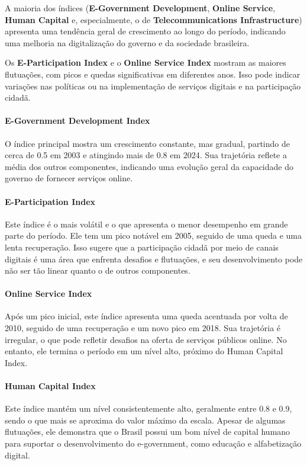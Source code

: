 A maioria dos índices (\textbf{E-Government Development}, \textbf{Online Service},  \textbf{Human Capital} e, especialmente, o de  \textbf{Telecommunications Infrastructure}) apresenta uma tendência geral de crescimento ao longo do período, indicando uma melhoria na digitalização do governo e da sociedade brasileira.

Os  \textbf{E-Participation Index} e o \textbf{Online Service Index} mostram as maiores flutuações, com picos e quedas significativas em diferentes anos. Isso pode indicar variações nas políticas ou na implementação de serviços digitais e na participação cidadã.

\paragraph{E-Government Development Index} O índice principal mostra um crescimento constante, mas gradual, partindo de cerca de 0.5 em 2003 e atingindo mais de 0.8 em 2024. Sua trajetória reflete a média dos outros componentes, indicando uma evolução geral da capacidade do governo de fornecer serviços online.

\paragraph{E-Participation Index} Este índice é o mais volátil e o que apresenta o menor desempenho em grande parte do período. Ele tem um pico notável em 2005, seguido de uma queda e uma lenta recuperação. Isso sugere que a participação cidadã por meio de canais digitais é uma área que enfrenta desafios e flutuações, e seu desenvolvimento pode não ser tão linear quanto o de outros componentes.

\paragraph{Online Service Index} Após um pico inicial, este índice apresenta uma queda acentuada por volta de 2010, seguido de uma recuperação e um novo pico em 2018. Sua trajetória é irregular, o que pode refletir desafios na oferta de serviços públicos online. No entanto, ele termina o período em um nível alto, próximo do Human Capital Index.

\paragraph{Human Capital Index} Este índice mantém um nível consistentemente alto, geralmente entre 0.8 e 0.9, sendo o que mais se aproxima do valor máximo da escala. Apesar de algumas flutuações, ele demonstra que o Brasil possui um bom nível de capital humano para suportar o desenvolvimento do e-government, como educação e alfabetização digital.

